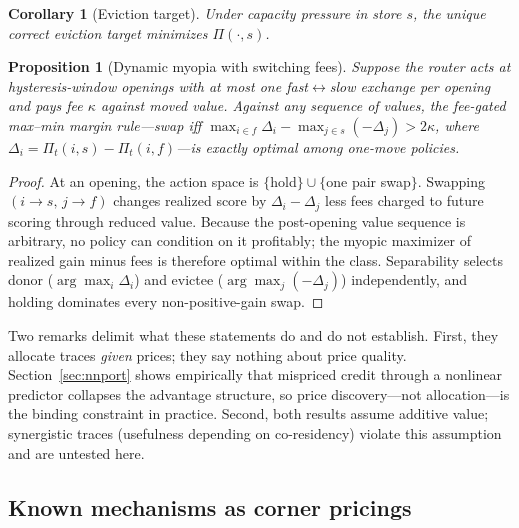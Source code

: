 \documentclass[11pt]{article}
\newtheorem{proposition}{Proposition}
\newtheorem{corollary}{Corollary}
\begin{document}
\begin{corollary}[Eviction target]
\label{cor:evict}
Under capacity pressure in store $s$, the unique correct eviction target minimizes $\Pi(\cdot,s)$.
\end{corollary}

\begin{proposition}[Dynamic myopia with switching fees]
\label{prop:dynamic}
Suppose the router acts at hysteresis-window openings with at most one fast$\leftrightarrow$slow
exchange per opening and pays fee $\kappa$ against moved value. Against any sequence of values, the
fee-gated max--min margin rule---swap iff
$\max_{i\in f}\Delta_i - \max_{j\in s}(-\Delta_j) > 2\kappa$, where
$\Delta_i = \Pi_t(i,s)-\Pi_t(i,f)$---is exactly optimal among one-move policies.
\end{proposition}
\begin{proof}
At an opening, the action space is $\{$hold$\}\cup\{$one pair swap$\}$. Swapping $(i\to s,\,j\to f)$
changes realized score by $\Delta_i - \Delta_j$ less fees charged to future scoring through reduced
value. Because the post-opening value sequence is arbitrary, no policy can condition on it profitably;
the myopic maximizer of realized gain minus fees is therefore optimal within the class. Separability
selects donor ($\arg\max_i \Delta_i$) and evictee ($\arg\max_j(-\Delta_j)$) independently, and holding
dominates every non-positive-gain swap.
\end{proof}

Two remarks delimit what these statements do and do not establish. First, they allocate traces
\emph{given} prices; they say nothing about price quality. Section~\ref{sec:nnport} shows empirically
that mispriced credit through a nonlinear predictor collapses the advantage structure, so price
discovery---not allocation---is the binding constraint in practice. Second, both results assume
additive value; synergistic traces (usefulness depending on co-residency) violate this assumption and
are untested here.

\subsection{Known mechanisms as corner pricings}
\end{document}
